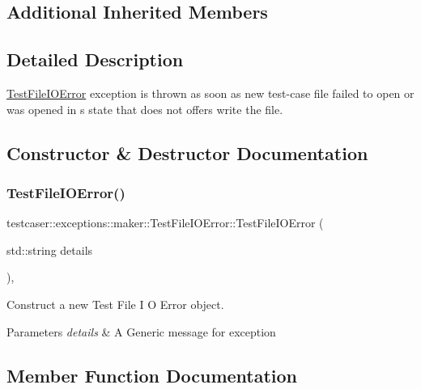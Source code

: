 \subsection*{Additional Inherited Members}


\subsection{Detailed Description}
\mbox{\hyperlink{classtestcaser_1_1exceptions_1_1maker_1_1TestFileIOError}{Test\+File\+I\+O\+Error}} exception is thrown as soon as new test-\/case file failed to open or was opened in s state that does not offers write the file. 



\subsection{Constructor \& Destructor Documentation}
\mbox{\label{classtestcaser_1_1exceptions_1_1maker_1_1TestFileIOError_a2168ea54454727b86b6e00e5cd8103e0}} 
\subsubsection{\texorpdfstring{TestFileIOError()}{TestFileIOError()}}
{\footnotesize\ttfamily testcaser\+::exceptions\+::maker\+::\+Test\+File\+I\+O\+Error\+::\+Test\+File\+I\+O\+Error (\begin{DoxyParamCaption}\item[{std\+::string}]{details }\end{DoxyParamCaption})\hspace{0.3cm}{\ttfamily [inline]}, {\ttfamily [explicit]}}



Construct a new Test File I O Error object. 


\begin{DoxyParams}{Parameters}
{\em details} & A Generic message for exception \\
\hline
\end{DoxyParams}


\subsection{Member Function Documentation}
\mbox{\label{classtestcaser_1_1exceptions_1_1maker_1_1TestFileIOError_ab83e748d26f860c9b045535447a383c5}} 
